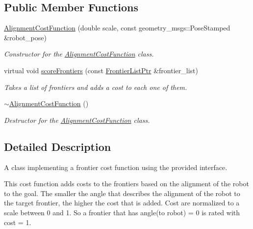 \subsection*{\-Public \-Member \-Functions}
\begin{DoxyCompactItemize}
\item 
\hyperlink{classpandora__exploration_1_1_alignment_cost_function_a322a7fbbe84531796c432cd09c71a278}{\-Alignment\-Cost\-Function} (double scale, const geometry\-\_\-msgs\-::\-Pose\-Stamped \&robot\-\_\-pose)
\begin{DoxyCompactList}\small\item\em \-Constructor for the \hyperlink{classpandora__exploration_1_1_alignment_cost_function}{\-Alignment\-Cost\-Function} class. \end{DoxyCompactList}\item 
virtual void \hyperlink{classpandora__exploration_1_1_alignment_cost_function_ab988fdf65ee634b21bf804d85880cb4f}{score\-Frontiers} (const \hyperlink{namespacepandora__exploration_a6f3b1959fca391e2ef3ac46b6e96be7a}{\-Frontier\-List\-Ptr} \&frontier\-\_\-list)
\begin{DoxyCompactList}\small\item\em \-Takes a list of frontiers and adds a cost to each one of them. \end{DoxyCompactList}\item 
\hyperlink{classpandora__exploration_1_1_alignment_cost_function_adac4fc7c269fe6a4a198770b4823bbfd}{$\sim$\-Alignment\-Cost\-Function} ()
\begin{DoxyCompactList}\small\item\em \-Destructor for the \hyperlink{classpandora__exploration_1_1_alignment_cost_function}{\-Alignment\-Cost\-Function} class. \end{DoxyCompactList}\end{DoxyCompactItemize}


\subsection{\-Detailed \-Description}
\-A class implementing a frontier cost function using the provided interface. 

\-This cost function adds costs to the frontiers based on the alignment of the robot to the goal. \-The smaller the angle that describes the alignment of the robot to the target frontier, the higher the cost that is added. \-Cost are normalized to a scale between 0 and 1. \-So a frontier that has angle(to robot) = 0 is rated with cost = 1. 

